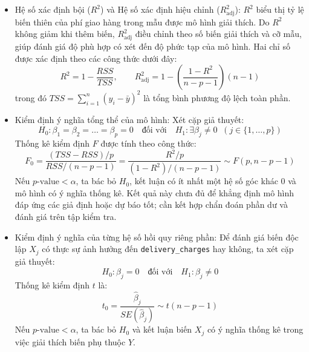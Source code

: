 	\begin{itemize}
		\item Hệ số xác định bội ($R^2$) và Hệ số xác định hiệu chỉnh ($R^2_{\text{adj}}$):
		$R^2$ biểu thị tỷ lệ biến thiên của phí giao hàng trong mẫu được mô hình giải thích. Do $R^2$ không giảm khi thêm biến, $R^2_{\text{adj}}$ điều chỉnh theo số biến giải thích và cỡ mẫu, giúp đánh giá độ phù hợp có xét đến độ phức tạp của mô hình. Hai chỉ số được xác định theo các công thức dưới đây:
		\begin{equation}
			R^2 = 1 - \frac{RSS}{TSS}, \qquad R^2_{\text{adj}} = 1 - \left(\frac{1 - R^2}{n - p - 1}\right)(n - 1)
		\end{equation}
		trong đó $TSS = \sum_{i=1}^{n} (y_i - \bar{y})^2$ là tổng bình phương độ lệch toàn phần.
		
		\item Kiểm định ý nghĩa tổng thể của mô hình:
		Xét cặp giả thuyết:
		\begin{equation*}
			H_0: \beta_1 = \beta_2 = \dots = \beta_p = 0 \quad \text{đối với} \quad H_1: \exists \beta_j \neq 0 \;\; (j \in \{1, \dots, p\})
		\end{equation*}
		Thống kê kiểm định $F$ được tính theo công thức:
		\begin{equation}
			F_0 = \frac{(TSS - RSS)/p}{RSS/(n - p - 1)} = \frac{R^2 / p}{(1 - R^2)/(n - p - 1)} \sim F(p, n - p - 1)
		\end{equation}
		Nếu $p\text{-value} < \alpha$, ta bác bỏ $H_0$, kết luận có ít nhất một hệ số góc khác 0 và mô hình có ý nghĩa thống kê. Kết quả này chưa đủ để khẳng định mô hình đáp ứng các giả định hoặc dự báo tốt; cần kết hợp chẩn đoán phần dư và đánh giá trên tập kiểm tra.
		
		\item Kiểm định ý nghĩa của từng hệ số hồi quy riêng phần:
		Để đánh giá biến độc lập $X_j$ có thực sự ảnh hưởng đến \texttt{delivery\_charges} hay không, ta xét cặp giả thuyết:
		\begin{equation*}
			H_0: \beta_j = 0 \quad \text{đối với} \quad H_1: \beta_j \neq 0
		\end{equation*}
		Thống kê kiểm định $t$ là:
		\begin{equation}
			t_0 = \frac{\hat{\beta}_j}{SE(\hat{\beta}_j)} \sim t(n - p - 1)
		\end{equation}
		Nếu $p\text{-value} < \alpha$, ta bác bỏ $H_0$ và kết luận biến $X_j$ có ý nghĩa thống kê trong việc giải thích biến phụ thuộc $Y$.
		
		
	\end{itemize}
	
